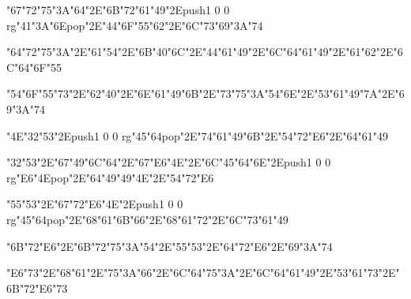 \vfill\eject
\null\vfill
\centerline{\ipa\char"67\ipa\char"72\ipa\char"75\ipa\char"3A\ipa\char"64\ipa\char"2E\ipa\char"6B\ipa\char"72\ipa\char"61\ipa\char"49\ipa\char"2E\pdfcolorstack\match push{1 0 0 rg}\ipa\char"41\ipa\char"3A\ipa\char"6E\pdfcolorstack\match pop{}\ipa\char"2E\ipa\char"44\ipa\char"6F\ipa\char"55\ipa\char"62\ipa\char"2E\ipa\char"6C\ipa\char"73\ipa\char"69\ipa\char"3A\ipa\char"74}\bigskip
\centerline{\ipa\char"64\ipa\char"72\ipa\char"75\ipa\char"3A\ipa\char"2E\ipa\char"61\ipa\char"54\ipa\char"2E\ipa\char"6B\ipa\char"40\ipa\char"6C\ipa\char"2E\ipa\char"44\ipa\char"61\ipa\char"49\ipa\char"2E\ipa\char"6C\ipa\char"64\ipa\char"61\ipa\char"49\ipa\char"2E\ipa\char"61\ipa\char"62\ipa\char"2E\ipa\char"6C\ipa\char"64\ipa\char"6F\ipa\char"55}\bigskip
\centerline{\ipa\char"54\ipa\char"6F\ipa\char"55\ipa\char"73\ipa\char"2E\ipa\char"62\ipa\char"40\ipa\char"2E\ipa\char"6E\ipa\char"61\ipa\char"49\ipa\char"6B\ipa\char"2E\ipa\char"73\ipa\char"75\ipa\char"3A\ipa\char"54\ipa\char"6E\ipa\char"2E\ipa\char"53\ipa\char"61\ipa\char"49\ipa\char"7A\ipa\char"2E\ipa\char"69\ipa\char"3A\ipa\char"74}
\vfill\eject
\null\vfill
\centerline{\ipa\char"4E\ipa\char"32\ipa\char"53\ipa\char"2E\pdfcolorstack\match push{1 0 0 rg}\ipa\char"45\ipa\char"64\pdfcolorstack\match pop{}\ipa\char"2E\ipa\char"74\ipa\char"61\ipa\char"49\ipa\char"6B\ipa\char"2E\ipa\char"54\ipa\char"72\ipa\char"E6\ipa\char"2E\ipa\char"64\ipa\char"61\ipa\char"49}\bigskip
\centerline{\ipa\char"32\ipa\char"53\ipa\char"2E\ipa\char"67\ipa\char"49\ipa\char"6C\ipa\char"64\ipa\char"2E\ipa\char"67\ipa\char"E6\ipa\char"4E\ipa\char"2E\ipa\char"6C\ipa\char"45\ipa\char"64\ipa\char"6E\ipa\char"2E\pdfcolorstack\match push{1 0 0 rg}\ipa\char"E6\ipa\char"4E\pdfcolorstack\match pop{}\ipa\char"2E\ipa\char"64\ipa\char"49\ipa\char"49\ipa\char"4E\ipa\char"2E\ipa\char"54\ipa\char"72\ipa\char"E6}\bigskip
\centerline{\ipa\char"55\ipa\char"53\ipa\char"2E\ipa\char"67\ipa\char"72\ipa\char"E6\ipa\char"4E\ipa\char"2E\pdfcolorstack\match push{1 0 0 rg}\ipa\char"45\ipa\char"64\pdfcolorstack\match pop{}\ipa\char"2E\ipa\char"68\ipa\char"61\ipa\char"6B\ipa\char"66\ipa\char"2E\ipa\char"68\ipa\char"61\ipa\char"72\ipa\char"2E\ipa\char"6C\ipa\char"73\ipa\char"61\ipa\char"49}
\vfill\eject
\null\vfill
\centerline{\ipa\char"6B\ipa\char"72\ipa\char"E6\ipa\char"2E\ipa\char"6B\ipa\char"72\ipa\char"75\ipa\char"3A\ipa\char"54\ipa\char"2E\ipa\char"55\ipa\char"53\ipa\char"2E\ipa\char"64\ipa\char"72\ipa\char"E6\ipa\char"2E\ipa\char"69\ipa\char"3A\ipa\char"74}\bigskip
\centerline{\ipa\char"E6\ipa\char"73\ipa\char"2E\ipa\char"68\ipa\char"61\ipa\char"2E\ipa\char"75\ipa\char"3A\ipa\char"66\ipa\char"2E\ipa\char"6C\ipa\char"64\ipa\char"75\ipa\char"3A\ipa\char"2E\ipa\char"6C\ipa\char"64\ipa\char"61\ipa\char"49\ipa\char"2E\ipa\char"53\ipa\char"61\ipa\char"73\ipa\char"2E\ipa\char"6B\ipa\char"72\ipa\char"E6\ipa\char"73}\bigskip
